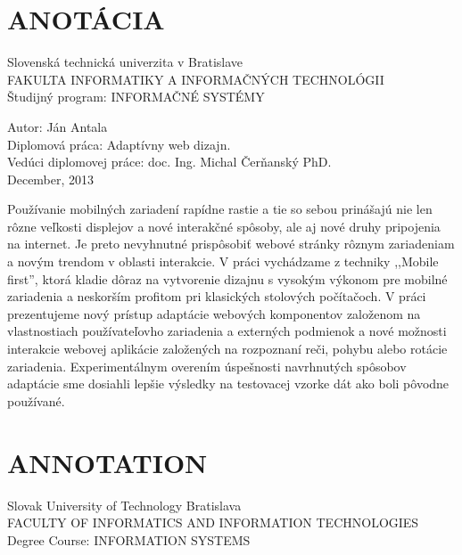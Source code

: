 
\newpage


%



\section*{ANOTÁCIA}
\thispagestyle{empty}
Slovenská technická univerzita v Bratislave\\
FAKULTA INFORMATIKY A INFORMAČNÝCH TECHNOLÓGII\\
Študijný program: INFORMAČNÉ SYSTÉMY
\newline

Autor: Ján Antala\\
Diplomová práca: Adaptívny web dizajn.\\ 
Vedúci diplomovej práce: doc. Ing. Michal Čerňanský PhD. \\
December, 2013
\newline

Používanie mobilných zariadení rapídne rastie a tie so sebou prinášajú nie len rôzne veľkosti displejov a nové interakčné spôsoby, ale aj nové druhy pripojenia na internet. Je preto nevyhnutné prispôsobiť webové stránky rôznym zariadeniam a novým trendom v oblasti interakcie.
V práci vychádzame z techniky ,,Mobile first'', ktorá kladie dôraz na vytvorenie dizajnu s vysokým výkonom pre mobilné zariadenia a neskorším profitom pri klasických stolových počítačoch. V práci prezentujeme nový prístup adaptácie webových komponentov založenom na vlastnostiach používateľovho zariadenia a externých podmienok a nové možnosti interakcie webovej aplikácie založených na rozpoznaní reči, pohybu alebo rotácie zariadenia.
Experimentálnym overením úspešnosti navrhnutých spôsobov adaptácie sme dosiahli lepšie výsledky na testovacej vzorke dát ako boli pôvodne používané.

\newpage

\section*{ANNOTATION}
\thispagestyle{empty}
Slovak University of Technology Bratislava\\
FACULTY OF INFORMATICS AND INFORMATION TECHNOLOGIES\\
Degree Course: INFORMATION SYSTEMS
\newline

